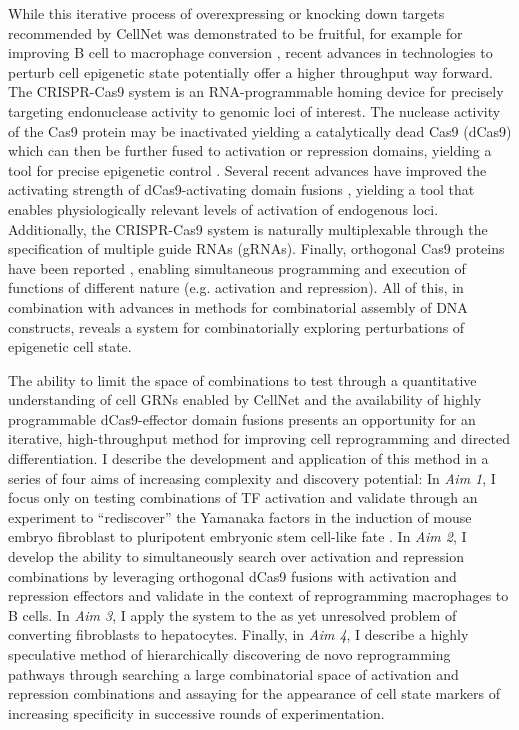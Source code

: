 \documentclass[10pt]{article}
\begin{document}
While this iterative process of overexpressing or knocking down targets recommended by CellNet was demonstrated to be fruitful, for example for improving B cell to macrophage conversion \cite{morris2014dissecting}, recent advances in technologies to perturb cell epigenetic state potentially offer a higher throughput way forward. The CRISPR-Cas9 system is an RNA-programmable homing device for precisely targeting endonuclease activity to genomic loci of interest. The nuclease activity of the Cas9 protein may be inactivated yielding a catalytically dead Cas9 (dCas9) which can then be further fused to activation or repression domains, yielding a tool for precise epigenetic control \cite{qi2013repurposing}. Several recent advances have improved the activating strength of dCas9-activating domain fusions \cite{konermann2014genome, chavez2015VPR}, yielding a tool that enables physiologically relevant levels of activation of endogenous loci. Additionally, the CRISPR-Cas9 system is naturally multiplexable through the specification of multiple guide RNAs (gRNAs). Finally, orthogonal Cas9 proteins have been reported \cite{esvelt2013orthogonal}, enabling simultaneous programming and execution of functions of different nature (e.g. activation and repression). All of this, in combination with advances in methods for combinatorial assembly of DNA constructs, reveals a system for combinatorially exploring perturbations of epigenetic cell state.

The ability to limit the space of combinations to test through a quantitative understanding of cell GRNs enabled by CellNet and the availability of highly programmable dCas9-effector domain fusions presents an opportunity for an iterative, high-throughput method for improving cell reprogramming and directed differentiation. I describe the development and application of this method in a series of four aims of increasing complexity and discovery potential: In \textit{Aim 1}, I focus only on testing combinations of TF activation and validate through an experiment to ``rediscover'' the Yamanaka factors in the induction of mouse embryo fibroblast to pluripotent embryonic stem cell-like fate \cite{takahashi2006induction}. In \textit{Aim 2}, I develop the ability to simultaneously search over activation and repression combinations by leveraging orthogonal dCas9 \cite{esvelt2013orthogonal} fusions with activation and repression effectors and validate in the context of reprogramming macrophages to B cells. In \textit{Aim 3}, I apply the system to the as yet unresolved problem of converting fibroblasts to hepatocytes. Finally, in \textit{Aim 4}, I describe a highly speculative method of hierarchically discovering de novo reprogramming pathways through searching a large combinatorial space of activation and repression combinations and assaying for the appearance of cell state markers of increasing specificity in successive rounds of experimentation.
\end{document}
